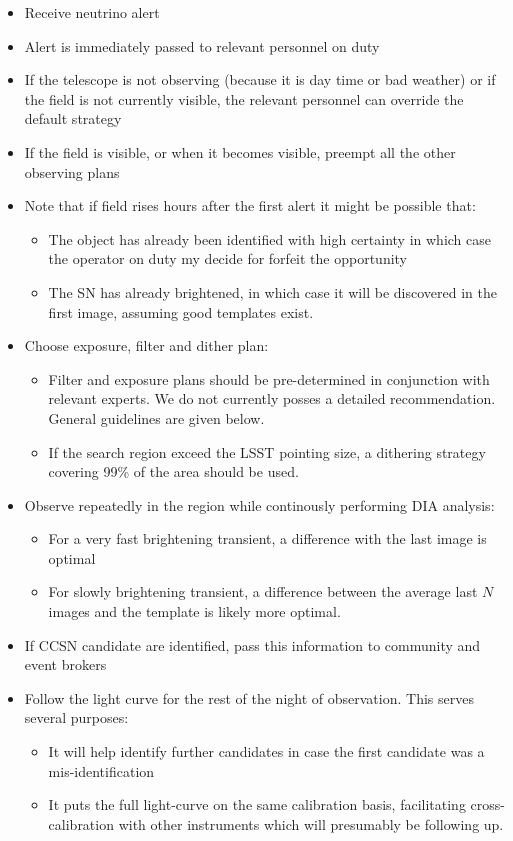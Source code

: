 \documentclass[11pt, letterpaper]{article}
\begin{document}
\begin{itemize}
\item Receive neutrino alert
\item Alert is immediately passed to relevant personnel on duty
\item If the telescope is not observing (because it is day time or bad weather) or if the field is not currently visible, the relevant personnel can override the default strategy
\item If the field is visible, or when it becomes visible, preempt all the other observing plans
\item Note that if field rises hours after the first alert it might be possible that:
\begin{itemize}
    \item The object has already been identified with high certainty in which case the operator on duty my decide for forfeit the opportunity
    \item The SN has already brightened, in which case it will be discovered in the first image, assuming good templates exist.
\end{itemize}

\item Choose exposure, filter and dither plan:
\begin{itemize}
\item Filter and exposure plans should be pre-determined in
  conjunction with relevant experts. We do not currently posses a
  detailed recommendation. General guidelines are given below.
    \item If the search region exceed the LSST pointing size, a dithering strategy covering 99\% of the area should be used.
\end{itemize}

\item Observe repeatedly in the region while continously performing DIA analysis:
\begin{itemize}
    \item For a very fast brightening transient, a difference with the last image is optimal
    \item For slowly brightening transient, a difference between the average last $N$ images and the template is likely more optimal.
\end{itemize}
\item If CCSN candidate are identified, pass this information to community and event brokers
\item Follow the light curve for the rest of the night of
  observation. This serves several purposes:
\begin{itemize}
    \item It will help identify further candidates in case the first candidate was a mis-identification
    \item It puts the full light-curve on the same calibration basis, facilitating cross-calibration with other instruments which will presumably be following up.
\end{itemize}
\end{itemize}
\end{document}
